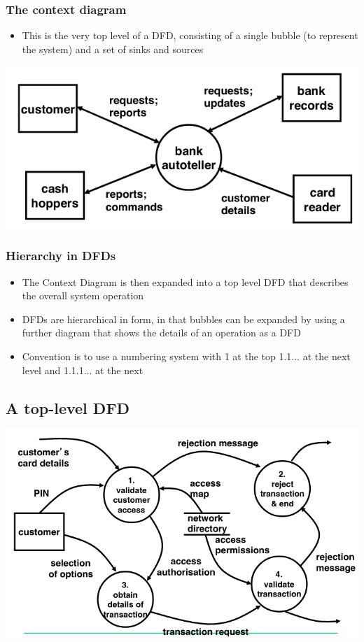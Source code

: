 \documentclass{article}[18pt]
\begin{document}
\subsubsection{The context diagram}
\begin{itemize}
	\item This is the very top level of a DFD, consisting of a single bubble (to represent the system) and a set of sinks and sources
\end{itemize}
\begin{center}
	\includegraphics[scale=0.7]{Context-Diagram}
\end{center}
\subsubsection{Hierarchy in DFDs}
\begin{itemize}
	\item The Context Diagram is then expanded into a top level DFD that describes the overall system operation
	\item DFDs are hierarchical in form, in that bubbles can be expanded by using a further diagram that shows the details of an operation as a DFD
	\item Convention is to use a numbering system with 1 at the top 1.1... at the next level and 1.1.1... at the next
\end{itemize}
\subsection{A top-level DFD}
\begin{center}
	\includegraphics[scale=0.7]{top-level-dfd}
\end{center}
\end{document}
